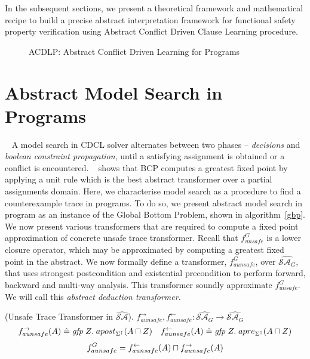 In the subsequent sections, we present a theoretical framework and mathematical 
recipe to build a precise abstract interpretation framework for functional safety 
property verification using Abstract Conflict Driven Clause Learning procedure. 
%
\begin{figure}
\centering
{}
\caption{ACDLP: Abstract Conflict Driven Learning for Programs \label{acdlp-top}}
\end{figure}
%
\section{Abstract Model Search in Programs}~\label{modelsearch}
%
A model search in CDCL solver alternates between two phases -- \emph{decisions} 
and \emph{boolean constraint propagation}, until a satisfying assignment is
obtained or a conflict is encountered. ~\cite{sas12} shows that BCP computes a
greatest fixed point by applying a unit rule which is the best abstract
transformer over a partial assignments domain.  Here, we characterise model
search as a procedure to find a counterexample trace in programs.  To do so, 
we present abstract model search in program as an instance of the Global Bottom 
Problem, shown in algorithm~\ref{gbp}.  We now present various transformers that 
are required to compute a fixed point approximation of concrete unsafe trace 
transformer.  
%
Recall that $f_{unsafe}^{G}$ is a lower closure operator, which may be approximated 
by computing a greatest fixed point in the abstract.  
%
We now formally define a transformer, $f_{aunsafe}^G$, over
$\widehat{\mathcal{SA}_{G}}$, that uses strongest postcondition and 
existential precondition to perform forward, backward and multi-way 
analysis.  This transformer soundly approximate $f_{unsafe}^{G}$.  
We will call this \emph{abstract deduction transformer}.
%
\begin{definition} (Unsafe Trace Transformer in $\widehat{\mathcal{SA}}$). 
  $f_{aunsafe}^{\rightarrow}, f_{aunsafe}^{\leftarrow} : \widehat{\mathcal{SA}_{G}}
  \rightarrow \widehat{\mathcal{SA}_{G}}$
  \[
    f_{aunsafe}^{\rightarrow}(A) \mathrel{\hat=} \mathit{gfp}\; Z.\;
    apost_{\Sigma^\dagger}(A \sqcap Z)
    \quad
    f_{aunsafe}^{\leftarrow}(A) \mathrel{\hat=} \mathit{gfp}\; Z.\;
    apre_{\Sigma^\dagger}(A \sqcap Z)
  \]
   \[
      f_{aunsafe}^{G} = f_{aunsafe}^{\leftarrow}(A) \sqcap f_{aunsafe}^{\rightarrow}(A) 
   \]  
\end{definition}
